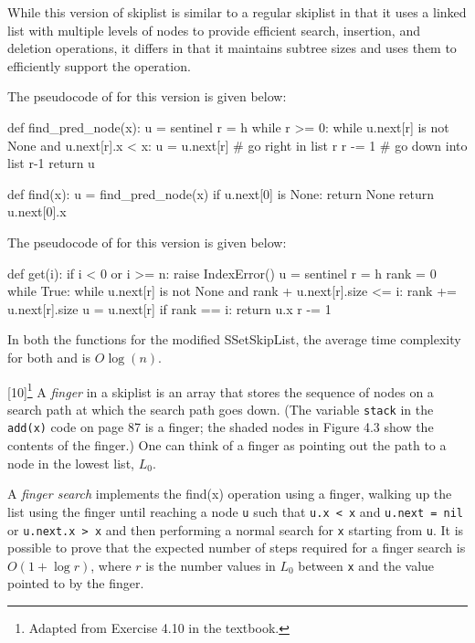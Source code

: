 \documentclass[addpoints]{exam}
\begin{document}
\begin{questions}
\begin{solution}
    While this version of skiplist is similar to a regular skiplist in that it uses a linked list with multiple levels of nodes to provide efficient search, insertion, and deletion operations, it differs in that it maintains subtree sizes and uses them to efficiently support the  operation. 

    The pseudocode of  for this version is given below:

    \begin{python}
      def find_pred_node(x):
      u = sentinel
      r = h
      while r >= 0:
        while u.next[r] is not None and u.next[r].x < x:
          u = u.next[r]  # go right in list r
        r -= 1  # go down into list r-1
      return u    

      def find(x):
        u = find_pred_node(x)
        if u.next[0] is None:
          return None
        return u.next[0].x
    \end{python}

    \pagebreak
    
    The pseudocode of  for this version is given below:

    \begin{python}
      def get(i):
        if i < 0 or i >= n: 
          raise IndexError()
        u = sentinel
        r = h
        rank = 0
        while True:
          while u.next[r] is not None and rank + u.next[r].size <= i:
            rank += u.next[r].size
            u = u.next[r]
          if rank == i:
            return u.x
          r -= 1
    \end{python}

    In both the functions for the modified SSetSkipList, the average time complexity for both  and  is $ O\log(n) $.

  \end{solution}

  \newpage

  [10]\footnote{Adapted from Exercise 4.10 in the textbook.}
  A \textit{finger} in a skiplist is an array that stores the sequence of nodes on a search path at which the search path goes down. (The variable \texttt{stack} in the \texttt{add(x)} code on page 87 is a finger; the shaded nodes in Figure 4.3 show the contents of the finger.) One can think of a finger as pointing out the path to a node in the lowest list, $L_0$.

  A \textit{finger search} implements the find(x) operation using a finger, walking up the list using the finger until reaching a node \texttt{u} such that \texttt{u.x < x} and \texttt{u.next = nil} or \texttt{u.next.x > x} and then performing a normal search for \texttt{x} starting from \texttt{u}. It is possible to prove that the expected number of steps required for a finger search is $O(1+\log r)$, where $r$ is the number values in $L_0$ between \texttt{x} and the value pointed to by the finger.


\end{questions}
\end{document}
